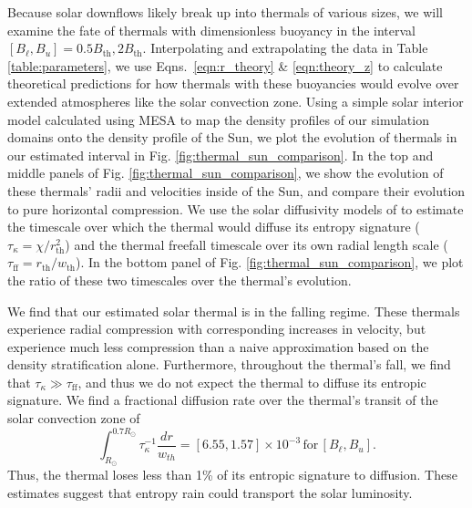 \documentclass[twocolumn, amsmath, amsfonts, amssymb, trackchanges]{aastex62}
\begin{document}
Because solar downflows likely break up into thermals of various sizes, we will examine the fate of thermals with dimensionless buoyancy in the interval $[B_\ell, B_u] = 0.5B_\text{th}, 2B_\text{th}$.
Interpolating and extrapolating the data in Table \ref{table:parameters}, we use Eqns.~\ref{eqn:r_theory} \& \ref{eqn:theory_z} to calculate theoretical predictions for how thermals with these buoyancies would evolve over extended atmospheres like the solar convection zone.
Using a simple solar interior model calculated using MESA \citep{paxton&all2011} to map the density profiles of our simulation domains onto the density profile of the Sun, we plot the evolution of thermals in our estimated interval in Fig. \ref{fig:thermal_sun_comparison}.
In the top and middle panels of Fig. \ref{fig:thermal_sun_comparison}, we show the evolution of these thermals' radii and velocities inside of the Sun, and compare their evolution to pure horizontal compression.
We use the solar diffusivity models of \citet{brown2011} to estimate the timescale over which the thermal would diffuse its entropy signature ($\tau_\kappa = \chi/r_{\text{th}}^2$) and the thermal freefall timescale over its own radial length scale ($\tau_{\text{ff}} = r_{\text{th}}/w_{\text{th}}$).
In the bottom panel of Fig. \ref{fig:thermal_sun_comparison}, we plot the ratio of these two timescales over the thermal's evolution.

We find that our estimated solar thermal is in the falling regime.
These thermals experience radial compression with corresponding increases in velocity, but experience much less compression than a naive approximation based on the density stratification alone.
Furthermore, throughout the thermal's fall, we find that $\tau_\kappa \gg \tau_{\text{ff}}$, and thus we do not expect the thermal to diffuse its entropic signature.
We find a fractional diffusion rate over the thermal's transit of the solar convection zone of 
$$
\int_{R_\odot}^{0.7 R_\odot} \tau_\kappa^{-1} \frac{dr}{w_{th}} = [6.55, 1.57]\times 10^{-3}\,\text{for}\,[B_\ell, B_u].
$$
Thus, the thermal loses less than 1\% of its entropic signature to diffusion.
These estimates suggest that entropy rain could transport the solar luminosity.

\end{document}
